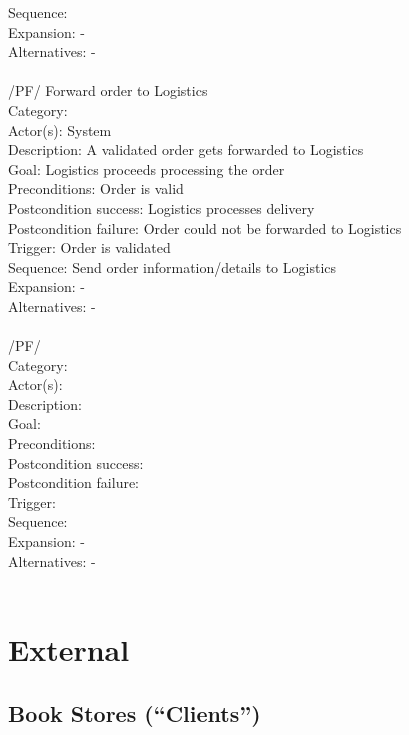 \documentclass[11pt,a4paper,oneside,svgnames,draft]{report}
\begin{document}
\begin{tabbing}
	 Sequence: \> \\
	 Expansion: \> -\\
	 Alternatives: \> -\\
	 \\
	 /PF/ \> Forward order to Logistics\\ 
	 Category: \> \\
	 Actor(s): \> System\\ 
	 Description: \> A validated order gets forwarded to Logistics\\ 
	 Goal: \> Logistics proceeds processing the order\\
	 Preconditions: \> Order is valid\\
	 Postcondition success: \> Logistics processes delivery\\
	 Postcondition failure: \> Order could not be forwarded to Logistics\\
	 Trigger: \> Order is validated\\
	 Sequence: \> Send order information/details to Logistics\\
	 Expansion: \> -\\
	 Alternatives: \> -\\
	 \\
	 /PF/ \> \\ 
	 Category: \> \\
	 Actor(s): \> \\ 
	 Description: \> \\ 
	 Goal: \> \\
	 Preconditions: \> \\
	 Postcondition success: \> \\
	 Postcondition failure: \> \\
	 Trigger: \> \\
	 Sequence: \> \\
	 Expansion: \> -\\
	 Alternatives: \> -\\
	 \\
\end{tabbing} 
\clearpage

\section{External}
\subsection{Book Stores (``Clients'')}
\end{document}

